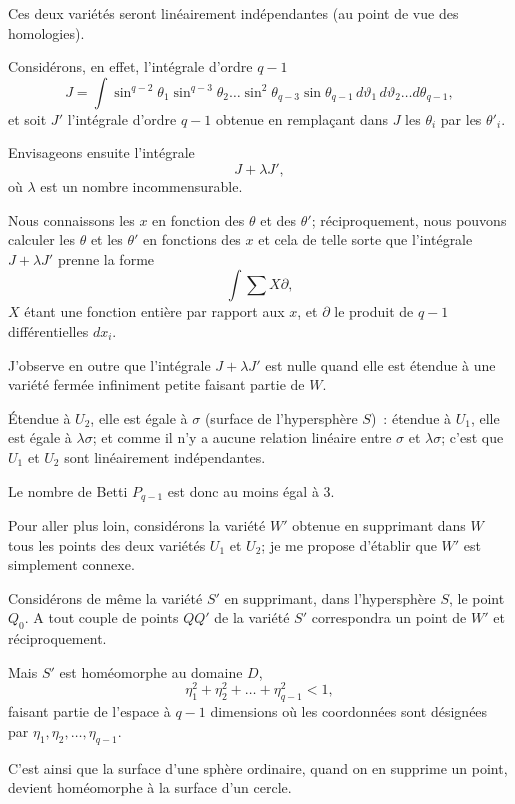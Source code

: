 \documentclass{article}
\begin{document}
Ces deux variétés seront linéairement indépendantes (au point de vue des homologies).

Considérons, en effet, l'intégrale d'ordre $q - 1$
\[ J = \int \sin^{q-2} \theta_{1} \sin^{q-3} \theta_{2} \ldots \sin^{2} \theta_{q-3} \sin \theta_{q-1}\,d\vartheta_{1}\,d\vartheta_{2} \ldots d\theta_{q-1}, \]
et soit $J'$ l'intégrale d'ordre $q - 1$ obtenue en remplaçant dans $J$ les $\theta_{i}$ par les $\theta'_{i}$.

Envisageons ensuite l'intégrale
\[ J + \lambda J', \]
où $\lambda$ est un nombre incommensurable.

Nous connaissons les $x$ en fonction des $\theta$ et des $\theta'$; réciproquement, nous pouvons calculer les $\theta$ et les $\theta'$ en fonctions des $x$ et cela de telle sorte que l'intégrale $J + \lambda J'$ prenne la forme
\[ \int \sum X \partial, \]
$X$ étant une fonction entière par rapport aux $x$, et $\partial$ le produit de $q - 1$ différentielles $dx_{i}$.

J'observe en outre que l'intégrale $J + \lambda J'$ est nulle quand elle est étendue à une variété fermée infiniment petite faisant partie de $W$.

Étendue à $U_{2}$, elle est égale à $\sigma$ (surface de l'hypersphère $S$)~: étendue à $U_{1}$, elle est égale à $\lambda\sigma$; et comme il n'y a aucune relation linéaire entre $\sigma$ et $\lambda\sigma$; c'est que $U_{1}$ et $U_{2}$ sont linéairement indépendantes.

Le nombre de Betti $P_{q-1}$ est donc au moins égal à 3.

Pour aller plus loin, considérons la variété $W'$ obtenue en supprimant dans $W$ tous les points des deux variétés $U_{1}$ et $U_{2}$; je me propose d'établir que $W'$ est simplement connexe.

Considérons de même la variété $S'$ en supprimant, dans l'hypersphère $S$, le point $Q_{0}$. A tout couple de points $QQ'$ de la variété $S'$ correspondra un point de $W'$ et réciproquement.

Mais $S'$ est homéomorphe au domaine $D$,
\[ \eta^{2}_{1} + \eta^{2}_{2} + \ldots + \eta^{2}_{q-1} < 1, \]
faisant partie de l'espace à $q - 1$ dimensions où les coordonnées sont désignées par $\eta_{1}, \eta_{2}, \ldots, \eta_{q-1}$.

C'est ainsi que la surface d'une sphère ordinaire, quand on en supprime un point, devient homéomorphe à la surface d'un cercle.
\end{document}
